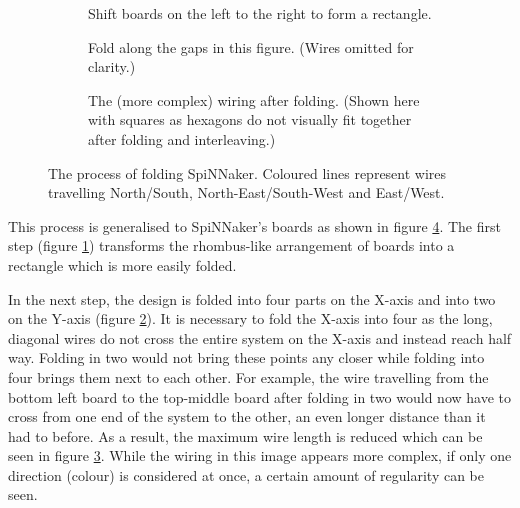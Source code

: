 			\begin{figure}
				\center
				\begin{subfigure}[b]{\textwidth}
					\center
					
					\caption{Shift boards on the left to the right to form a rectangle.}
					\label{fig:boardsFoldedShift}
				\end{subfigure}
				
				\vspace{2ex}
				
				\begin{subfigure}[b]{\textwidth}
					\center
					
					\caption{Fold along the gaps in this figure. (Wires omitted for
					clarity.)}
					\label{fig:boardsFoldedSpaced}
				\end{subfigure}
				
				\vspace{2ex}
				
				\begin{subfigure}[b]{\textwidth}
					\center
					
					\caption{The (more complex) wiring after folding. (Shown here with
					squares as hexagons do not visually fit together after folding and
					interleaving.)}
					\label{fig:boardsFoldedInterleaved}
				\end{subfigure}
				
				\caption[Folding SpiNNaker.]{The process of folding SpiNNaker. Coloured
				lines represent wires travelling {\color{red}North/South},
				{\color{green}North-East/South-West} and {\color{blue}East/West}.}
				\label{fig:boardsFolded}
			\end{figure}
			
			This process is generalised to SpiNNaker's boards as shown in figure
			\ref{fig:boardsFolded}. The first step (figure
			\ref{fig:boardsFoldedShift}) transforms the rhombus-like arrangement of
			boards into a rectangle which is more easily folded.
			
			In the next step, the design is folded into four parts on the X-axis and
			into two on the Y-axis (figure \ref{fig:boardsFoldedSpaced}). It is
			necessary to fold the X-axis into four as the long, diagonal wires do not
			cross the entire system on the X-axis and instead reach half way. Folding
			in two would not bring these points any closer while folding into four
			brings them next to each other. For example, the wire travelling from the
			bottom left board to the top-middle board after folding in two would now
			have to cross from one end of the system to the other, an even longer
			distance than it had to before. As a result, the maximum wire length is
			reduced which can be seen in figure \ref{fig:boardsFoldedInterleaved}.
			While the wiring in this image appears more complex, if only one direction
			(colour) is considered at once, a certain amount of regularity can be
			seen.
			
